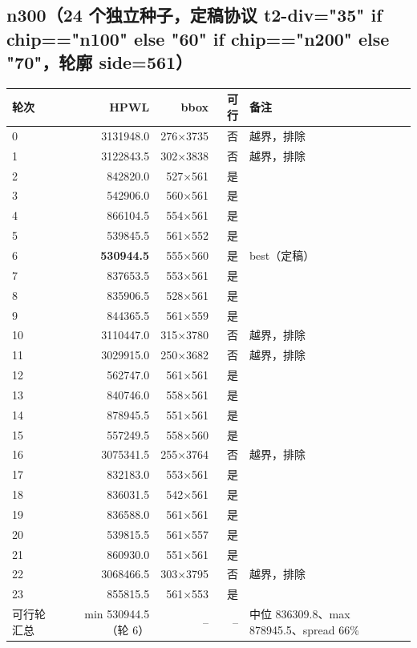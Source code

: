 \documentclass[12pt,a4paper]{article}
\begin{document}
\subsection{n300（24 个独立种子，定稿协议 t2-div={"35" if chip=="n100" else "60" if chip=="n200" else "70"}，轮廓 side=561）}
\begin{table}[H]
\centering
\scriptsize
\setlength{\tabcolsep}{2.5pt}
\begin{tabular}{lrrrl}
\toprule
轮次 & HPWL & bbox & 可行 & 备注 \\
\midrule
0 & 3131948.0 & 276×3735 & 否 & 越界，排除 \\
1 & 3122843.5 & 302×3838 & 否 & 越界，排除 \\
2 & 842820.0 & 527×561 & 是 &  \\
3 & 542906.0 & 560×561 & 是 &  \\
4 & 866104.5 & 554×561 & 是 &  \\
5 & 539845.5 & 561×552 & 是 &  \\
6 & \textbf{530944.5} & 555×560 & 是 & best（定稿） \\
7 & 837653.5 & 553×561 & 是 &  \\
8 & 835906.5 & 528×561 & 是 &  \\
9 & 844365.5 & 561×559 & 是 &  \\
10 & 3110447.0 & 315×3780 & 否 & 越界，排除 \\
11 & 3029915.0 & 250×3682 & 否 & 越界，排除 \\
12 & 562747.0 & 561×561 & 是 &  \\
13 & 840746.0 & 558×561 & 是 &  \\
14 & 878945.5 & 551×561 & 是 &  \\
15 & 557249.5 & 558×560 & 是 &  \\
16 & 3075341.5 & 255×3764 & 否 & 越界，排除 \\
17 & 832183.0 & 553×561 & 是 &  \\
18 & 836031.5 & 542×561 & 是 &  \\
19 & 836588.0 & 561×561 & 是 &  \\
20 & 539815.5 & 561×557 & 是 &  \\
21 & 860930.0 & 551×561 & 是 &  \\
22 & 3068466.5 & 303×3795 & 否 & 越界，排除 \\
23 & 855815.5 & 561×553 & 是 &  \\
\midrule
可行轮汇总 & min 530944.5（轮 6） & -- & -- & 中位 836309.8、max 878945.5、spread 66\% \\
\bottomrule
\end{tabular}
\end{table}
\end{document}
